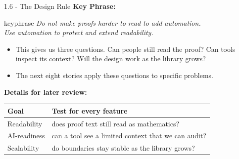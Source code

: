 \documentclass[aspectratio=169,11pt]{beamer}
\begin{document}
\begin{frame}[fragile,t]{1.6 - The Design Rule}
\smallskip
\textbf{Key Phrase:}
\begin{center}
\begin{beamercolorbox}[rounded=true,sep=2.5mm,wd=0.9\textwidth]{keyphrase}
\centering\itshape Do not make proofs harder to read to add automation.\\ Use automation to protect and extend readability.
\end{beamercolorbox}
\end{center}
\begin{itemize}
\setlength{\itemsep}{1pt}
\setlength{\parsep}{0pt}
\setlength{\parskip}{0pt}
\item This gives us three questions. Can people still read the proof? Can tools inspect its context? Will the design work as the library grows?
\item The next eight stories apply these questions to specific problems.
\end{itemize}
\smallskip
\textbf{Details for later review:}
\begin{footnotesize}
\setlength{\tabcolsep}{3pt}
\renewcommand{\arraystretch}{1.15}
\begin{tabularx}{\textwidth}{>{\raggedright\arraybackslash}X>{\raggedright\arraybackslash}X}
\toprule
\textbf{Goal} & \textbf{Test for every feature} \\
\midrule
Readability & does proof text still read as mathematics? \\
AI-readiness & can a tool see a limited context that we can audit? \\
Scalability & do boundaries stay stable as the library grows? \\
\bottomrule
\end{tabularx}
\end{footnotesize}

\end{frame}
\end{document}
